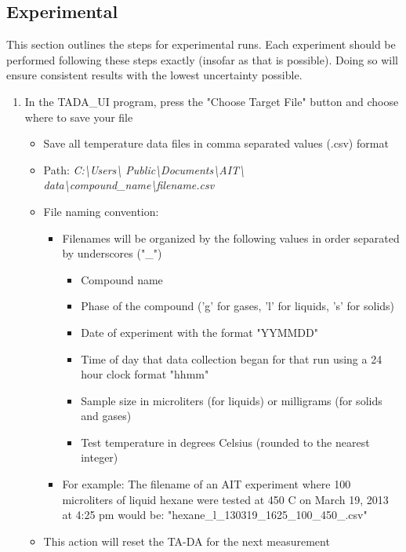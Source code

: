 \documentclass[letterpaper,11pt]{article}
\begin{document}
\subsection{Experimental}
This section outlines the steps for experimental runs. Each experiment should be
performed following these steps exactly (insofar as that is possible). Doing so
will ensure consistent results with the lowest uncertainty possible.
    \begin{enumerate}
  
    \item In the TADA\_UI program, press the "Choose Target File" button and 
        choose where to save your file
        \begin{itemize}
        \item Save all temperature data files in comma separated values (.csv) 
            format
        \item Path: \textit{C:\textbackslash Users\textbackslash 
            Public\textbackslash Documents\textbackslash AIT\textbackslash 
            data\textbackslash compound\_name\textbackslash filename.csv}
        \item File naming convention: 
            \begin{itemize}
            \item Filenames will be organized by the following values in order 
                separated by underscores ("\_")
                    \begin{itemize}
                    \item Compound name
                    \item Phase of the compound ('g' for gases, 'l' for liquids,
                        's' for solids)
                    \item Date of experiment with the format "YYMMDD"
                    \item Time of day that data collection began for that run
                        using a 24 hour clock format "hhmm"
                    \item Sample size in microliters (for liquids) or milligrams
                        (for solids and gases)
                    \item Test temperature in degrees Celsius (rounded to the 
                        nearest integer)
                    \end{itemize}
                    
            \item For example: The filename of an AIT experiment where 100 
                microliters of liquid hexane were tested at 450 \degree C on 
                March 19, 2013 at 4:25 pm would be: \newline
                "hexane\_l\_130319\_1625\_100\_450\_.csv"
            \end{itemize}    
        \item This action will reset the TA-DA for the next measurement        
        \end{itemize}
    

\end{enumerate}
\end{document}
